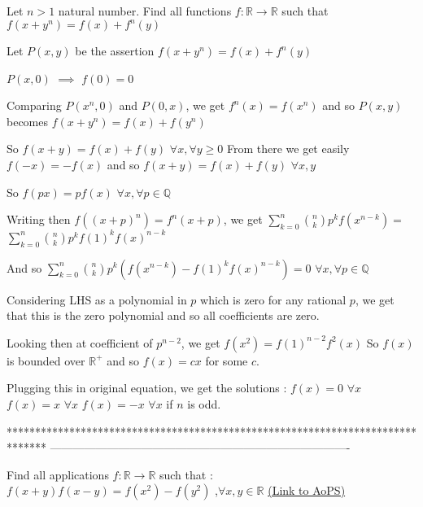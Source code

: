\begin{solution}
	\begin{tcolorbox}Let $n>1$ natural number. Find all functions $ f :\mathbb{R}\rightarrow\mathbb{R} $ such that $ f(x+y^{n})=f(x)+f^{n}(y) $\end{tcolorbox}
Let $P(x,y)$ be the assertion $f(x+y^n)=f(x)+f^n(y)$

$P(x,0)$ $\implies$ $f(0)=0$

Comparing $P(x^n,0)$ and $P(0,x)$, we get $f^n(x)=f(x^n)$ and so $P(x,y)$ becomes $f(x+y^n)=f(x)+f(y^n)$

So $f(x+y)=f(x)+f(y)$ $\forall x,\forall y\ge 0$
From there we get easily $f(-x)=-f(x)$ and so $f(x+y)=f(x)+f(y)$ $\forall x,y$

So $f(px)=pf(x)$ $\forall x,\forall p\in\mathbb Q$

Writing then $f((x+p)^n)=f^n(x+p)$, we get $\sum_{k=0}^n\binom nkp^kf(x^{n-k})=$ $\sum_{k=0}^n\binom nkp^kf(1)^kf(x)^{n-k}$

And so $\sum_{k=0}^n\binom nkp^k\left(f(x^{n-k})-f(1)^kf(x)^{n-k}\right)=0$ $\forall x,\forall p\in\mathbb Q$

Considering LHS as a polynomial in $p$ which is zero for any rational $p$, we get that this is the zero polynomial and so all coefficients are zero.

Looking then at coefficient of $p^{n-2}$, we get $f(x^2)=f(1)^{n-2}f^2(x)$
So $f(x)$ is bounded over $\mathbb R^+$ and so $f(x)=cx$ for some $c$.

Plugging this in original equation, we get the solutions :
$f(x)=0$ $\forall x$
$f(x)=x$ $\forall x$
$f(x)=-x$ $\forall x$ if $n$ is odd.
\end{solution}
*******************************************************************************
-------------------------------------------------------------------------------

\begin{problem}
	Find all applications $f:\mathbb{R}\rightarrow \mathbb{R}$ such that : $f(x+y)f(x-y)=f(x^2)-f(y^2)$ ,$\forall{x,y\in{\mathbb{R}}}$
	\flushright \href{https://artofproblemsolving.com/community/c6h474192}{(Link to AoPS)}
\end{problem}



